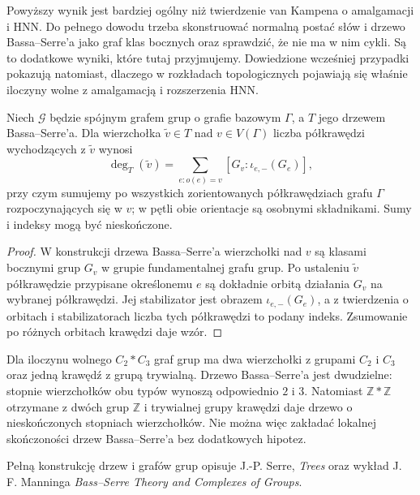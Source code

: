 \begin{uwaga}
Powyższy wynik jest bardziej ogólny niż twierdzenie van
Kampena o amalgamacji i HNN. Do pełnego dowodu trzeba
skonstruować normalną postać słów i drzewo Bassa--Serre'a
jako graf klas bocznych oraz sprawdzić, że nie ma w nim
cykli. Są to dodatkowe wyniki, które tutaj przyjmujemy.
Dowiedzione wcześniej przypadki pokazują natomiast,
dlaczego w rozkładach topologicznych pojawiają się właśnie
iloczyny wolne z amalgamacją i rozszerzenia HNN.
\end{uwaga}

\begin{stwierdzenie}
Niech $\mathcal G$ będzie spójnym grafem grup o grafie bazowym
$\Gamma$, a $T$ jego drzewem Bassa--Serre'a. Dla
wierzchołka $\widetilde v\in T$ nad $v\in V(\Gamma)$
liczba półkrawędzi wychodzących z $\widetilde v$ wynosi
\[
\deg_T(\widetilde v)=
\sum_{e\colon o(e)=v}[G_v:\iota_{e,-}(G_e)],
\]
przy czym sumujemy po wszystkich zorientowanych
półkrawędziach grafu $\Gamma$ rozpoczynających się w $v$;
w pętli obie orientacje są osobnymi składnikami.
Sumy i indeksy mogą być nieskończone.
\end{stwierdzenie}
\begin{proof}
W konstrukcji drzewa Bassa--Serre'a wierzchołki nad $v$
są klasami bocznymi grup $G_v$ w grupie fundamentalnej
grafu grup. Po ustaleniu $\widetilde v$ półkrawędzie
przypisane określonemu $e$ są dokładnie orbitą działania
$G_v$ na wybranej półkrawędzi. Jej stabilizator jest
obrazem $\iota_{e,-}(G_e)$, a z twierdzenia o orbitach
i stabilizatorach liczba tych półkrawędzi to podany indeks.
Zsumowanie po różnych orbitach krawędzi daje wzór.
\end{proof}
\begin{przyklad}
Dla iloczynu wolnego $C_2*C_3$ graf grup ma dwa wierzchołki
z grupami $C_2$ i $C_3$ oraz jedną krawędź z grupą trywialną.
Drzewo Bassa--Serre'a jest dwudzielne: stopnie wierzchołków
obu typów wynoszą odpowiednio $2$ i $3$. Natomiast
$\mathbb Z*\mathbb Z$ otrzymane z dwóch grup $\mathbb Z$
i trywialnej grupy krawędzi daje drzewo o nieskończonych
stopniach wierzchołków. Nie można więc zakładać lokalnej
skończoności drzew Bassa--Serre'a bez dodatkowych hipotez.
\end{przyklad}

\begin{uwaga}[Literatura]
Pełną konstrukcję drzew i grafów grup opisuje J.-P. Serre,
\emph{Trees} oraz wykład J. F. Manninga
\emph{Bass--Serre Theory and Complexes of Groups}.
\end{uwaga}


